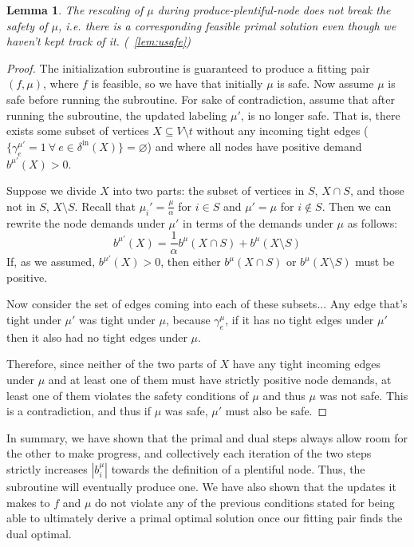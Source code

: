 \documentclass[11pt]{article}
\newtheorem{lemma}[theorem]{Lemma}
\theoremstyle{definition}
\theoremstyle{definition}
\newcommand{\biu}{b_{i}^{\mu}}
\newcommand{\geu}{\gamma_e^{\mu}}
\newcommand{\vnott}{V \setminus t}
\newcommand{\din}{\delta^{\text{in}}}
\newcommand{\fp}{(f,\mu)}
\newcommand{\todo}[1]{}%
\begin{document}
    \begin{lemma}
        The rescaling of $\mu$ during produce-plentiful-node does not break 
        the safety of $\mu$, i.e. there is a corresponding feasible primal
        solution even though we haven't kept track of it.
        \todo{Why is this here:} (~\ref{lem:usafe})
    \end{lemma}
    \begin{proof}
    The initialization subroutine is guaranteed to produce a fitting pair $\fp$,
    where $f$ is feasible, so we have that initially $\mu$ is safe. Now assume $\mu$
    is safe before running the subroutine. For sake of contradiction, assume that
    after running the subroutine, the updated labeling $\mu'$,
    is no longer safe. That is, there exists some subset of vertices $X \subseteq \vnott$  
    without any incoming tight edges ($\{\gamma_e^{\mu'} = 1\ \forall\ e \in \din(X)\} = \varnothing$)
    and where all nodes have positive demand $b^{\mu'}(X) > 0$.

    Suppose we divide $X$ into two parts: the subset of vertices in $S$, $X \cap S$, and those
    not in $S$, $X \setminus S$. Recall that $\mu_i' = \frac{\mu}{\alpha}$ for $i\in S$
    and $\mu' = \mu$ for $i \notin S$. Then we can rewrite the node demands under $\mu'$
    in terms of the demands under $\mu$ as follows:
    $$b^{\mu'}(X) = \frac{1}{\alpha}b^{\mu}(X \cap S) + b^{\mu}(X \setminus S)$$
    If, as we assumed, $b^{\mu'}(X) > 0$, then either $b^{\mu}(X \cap S)$ or 
    $b^{\mu}(X \setminus S)$ must be positive.
    \todo{Fill in details. $\mu'$ is defined in terms of $S$.}
    Now consider the set of edges coming into each of these subsets...
    Any edge that's tight under $\mu'$ was tight under $\mu$, because $\geu$, if
    it has no tight edges under $\mu'$ then it also had no tight edges under
    $\mu$.

    Therefore, since neither of the two parts of $X$
    have any tight incoming edges under $\mu$ and at least one of them
    must have strictly positive node demands, at least one of them
    violates the safety conditions of $\mu$ and thus $\mu$ was not safe.
    This is a contradiction, and thus if $\mu$ was safe, $\mu'$ must also be safe.

    \end{proof}

    In summary, we have shown that the primal and dual steps always allow room for the other to make progress, and collectively each iteration of the two steps strictly increases $|\biu|$ towards
    the definition of a plentiful node. Thus, the subroutine will eventually produce one. We have also shown that the updates it makes to $f$ and $\mu$ do not violate any of the previous conditions stated for being able to ultimately derive a primal optimal solution once our fitting pair finds the dual optimal. 
\end{document}
